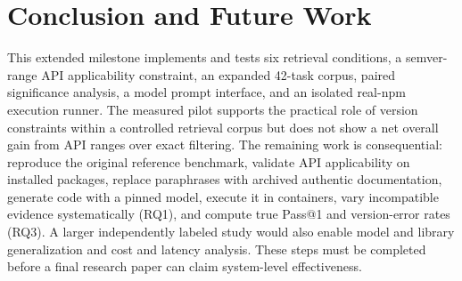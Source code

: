 \documentclass[conference]{IEEEtran}
\begin{document}
\section{Conclusion and Future Work}
This extended milestone implements and tests six retrieval conditions, a semver-range API applicability constraint, an expanded 42-task corpus, paired significance analysis, a model prompt interface, and an isolated real-npm execution runner. The measured pilot supports the practical role of version constraints within a controlled retrieval corpus but does not show a net overall gain from API ranges over exact filtering. The remaining work is consequential: reproduce the original reference benchmark, validate API applicability on installed packages, replace paraphrases with archived authentic documentation, generate code with a pinned model, execute it in containers, vary incompatible evidence systematically (RQ1), and compute true Pass@1 and version-error rates (RQ3). A larger independently labeled study would also enable model and library generalization and cost and latency analysis. These steps must be completed before a final research paper can claim system-level effectiveness.
\end{document}
